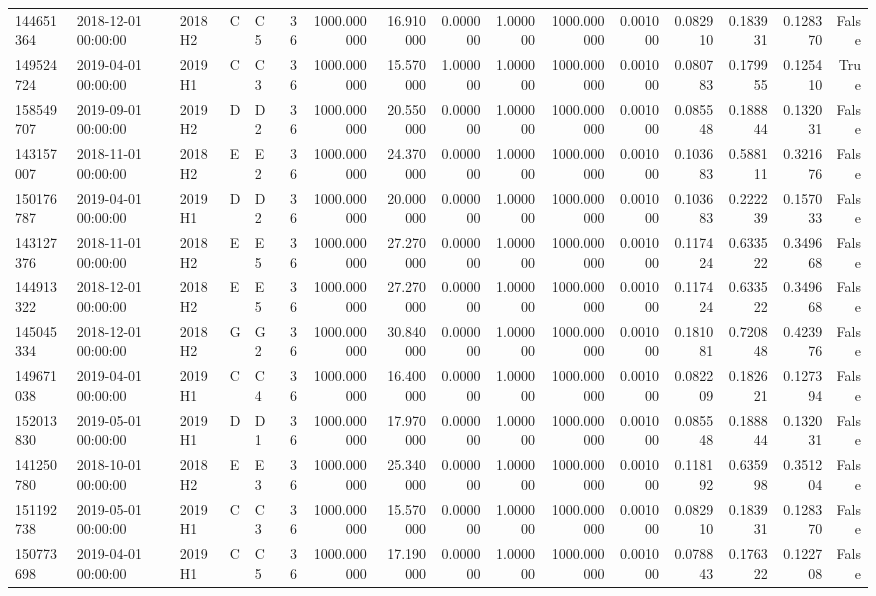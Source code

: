 \begin{tabular}{lllllrrrrrrrrrrr}
144651364 & 2018-12-01 00:00:00 & 2018H2 & C & C5 & 36 & 1000.000000 & 16.910000 & 0.000000 & 1.000000 & 1000.000000 & 0.001000 & 0.082910 & 0.183931 & 0.128370 & False \\
149524724 & 2019-04-01 00:00:00 & 2019H1 & C & C3 & 36 & 1000.000000 & 15.570000 & 1.000000 & 1.000000 & 1000.000000 & 0.001000 & 0.080783 & 0.179955 & 0.125410 & True \\
158549707 & 2019-09-01 00:00:00 & 2019H2 & D & D2 & 36 & 1000.000000 & 20.550000 & 0.000000 & 1.000000 & 1000.000000 & 0.001000 & 0.085548 & 0.188844 & 0.132031 & False \\
143157007 & 2018-11-01 00:00:00 & 2018H2 & E & E2 & 36 & 1000.000000 & 24.370000 & 0.000000 & 1.000000 & 1000.000000 & 0.001000 & 0.103683 & 0.588111 & 0.321676 & False \\
150176787 & 2019-04-01 00:00:00 & 2019H1 & D & D2 & 36 & 1000.000000 & 20.000000 & 0.000000 & 1.000000 & 1000.000000 & 0.001000 & 0.103683 & 0.222239 & 0.157033 & False \\
143127376 & 2018-11-01 00:00:00 & 2018H2 & E & E5 & 36 & 1000.000000 & 27.270000 & 0.000000 & 1.000000 & 1000.000000 & 0.001000 & 0.117424 & 0.633522 & 0.349668 & False \\
144913322 & 2018-12-01 00:00:00 & 2018H2 & E & E5 & 36 & 1000.000000 & 27.270000 & 0.000000 & 1.000000 & 1000.000000 & 0.001000 & 0.117424 & 0.633522 & 0.349668 & False \\
145045334 & 2018-12-01 00:00:00 & 2018H2 & G & G2 & 36 & 1000.000000 & 30.840000 & 0.000000 & 1.000000 & 1000.000000 & 0.001000 & 0.181081 & 0.720848 & 0.423976 & False \\
149671038 & 2019-04-01 00:00:00 & 2019H1 & C & C4 & 36 & 1000.000000 & 16.400000 & 0.000000 & 1.000000 & 1000.000000 & 0.001000 & 0.082209 & 0.182621 & 0.127394 & False \\
152013830 & 2019-05-01 00:00:00 & 2019H1 & D & D1 & 36 & 1000.000000 & 17.970000 & 0.000000 & 1.000000 & 1000.000000 & 0.001000 & 0.085548 & 0.188844 & 0.132031 & False \\
141250780 & 2018-10-01 00:00:00 & 2018H2 & E & E3 & 36 & 1000.000000 & 25.340000 & 0.000000 & 1.000000 & 1000.000000 & 0.001000 & 0.118192 & 0.635998 & 0.351204 & False \\
151192738 & 2019-05-01 00:00:00 & 2019H1 & C & C3 & 36 & 1000.000000 & 15.570000 & 0.000000 & 1.000000 & 1000.000000 & 0.001000 & 0.082910 & 0.183931 & 0.128370 & False \\
150773698 & 2019-04-01 00:00:00 & 2019H1 & C & C5 & 36 & 1000.000000 & 17.190000 & 0.000000 & 1.000000 & 1000.000000 & 0.001000 & 0.078843 & 0.176322 & 0.122708 & False \\

\end{tabular}
